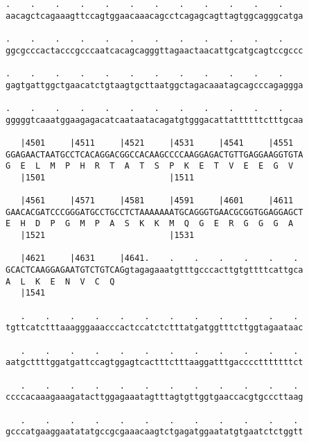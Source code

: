 \documentclass{article}
\begin{document}
\begin{Verbatim}
.    .    .    .    .    .    .    .    .    .    .    .    
aacagctcagaaagttccagtggaacaaacagcctcagagcagttagtggcagggcatga
                                                            
.    .    .    .    .    .    .    .    .    .    .    .    
ggcgcccactacccgcccaatcacagcagggttagaactaacattgcatgcagtccgccc
                                                            
.    .    .    .    .    .    .    .    .    .    .    .    
gagtgattggctgaacatctgtaagtgcttaatggctagacaaatagcagcccagaggga
                                                            
.    .    .    .    .    .    .    .    .    .    .    .    
gggggtcaaatggaagagacatcaataatacagatgtgggacattattttttctttgcaa
                                                            
   |4501     |4511     |4521     |4531     |4541     |4551  
GGAGAACTAATGCCTCACAGGACGGCCACAAGCCCCAAGGAGACTGTTGAGGAAGGTGTA
G  E  L  M  P  H  R  T  A  T  S  P  K  E  T  V  E  E  G  V  
   |1501                         |1511                      
  
   |4561     |4571     |4581     |4591     |4601     |4611  
GAACACGATCCCGGGATGCCTGCCTCTAAAAAAATGCAGGGTGAACGCGGTGGAGGAGCT
E  H  D  P  G  M  P  A  S  K  K  M  Q  G  E  R  G  G  G  A  
   |1521                         |1531                      
  
   |4621     |4631     |4641.    .    .    .    .    .    . 
GCACTCAAGGAGAATGTCTGTCAGgtagagaaatgtttgcccacttgtgttttcattgca
A  L  K  E  N  V  C  Q                                      
   |1541                                                    
  
   .    .    .    .    .    .    .    .    .    .    .    . 
tgttcatctttaaagggaaacccactccatctctttatgatggtttcttggtagaataac
                                                            
   .    .    .    .    .    .    .    .    .    .    .    . 
aatgcttttggatgattccagtggagtcactttctttaaggatttgacccctttttttct
                                                            
   .    .    .    .    .    .    .    .    .    .    .    . 
ccccacaaagaaagatacttggagaaatagtttagtgttggtgaaccacgtgcccttaag
                                                            
   .    .    .    .    .    .    .    .    .    .    .    . 
gcccatgaaggaatatatgccgcgaaacaagtctgagatggaatatgtgaatctctggtt
                                                            

\end{Verbatim}
\end{document}
